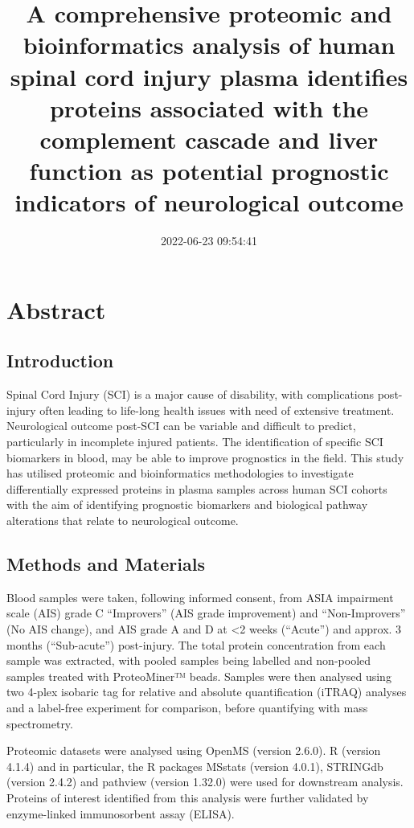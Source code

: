 \documentclass[9pt,lineno]{elife}
\title{A comprehensive proteomic and bioinformatics analysis of human spinal cord injury plasma identifies proteins associated with the complement cascade and liver function as potential prognostic indicators of neurological outcome}
\author{}
\date{2022-06-23 09:54:41}
\begin{document}
\maketitle

\hypertarget{abstract}{%
\section{Abstract}\label{abstract}}

\hypertarget{introduction}{%
\subsection{Introduction}\label{introduction}}

Spinal Cord Injury (SCI) is a major cause of disability, with complications post-injury often leading to life-long health issues with need of extensive treatment.
Neurological outcome post-SCI can be variable and difficult to predict, particularly in incomplete injured patients.
The identification of specific SCI biomarkers in blood, may be able to improve prognostics in the field.
This study has utilised proteomic and bioinformatics methodologies to investigate differentially expressed proteins in plasma samples across human SCI cohorts with the aim of identifying prognostic biomarkers and biological pathway alterations that relate to neurological outcome.

\hypertarget{methods-and-materials}{%
\subsection{Methods and Materials}\label{methods-and-materials}}

Blood samples were taken, following informed consent, from ASIA impairment scale (AIS) grade C ``Improvers'' (AIS grade improvement) and ``Non-Improvers'' (No AIS change), and AIS grade A and D at \textless2 weeks (``Acute'') and approx. 3 months (``Sub-acute'') post-injury.
The total protein concentration from each sample was extracted, with pooled samples being labelled and non-pooled samples treated with ProteoMiner™ beads.
Samples were then analysed using two 4-plex isobaric tag for relative and absolute quantification (iTRAQ) analyses and a label-free experiment for comparison, before quantifying with mass spectrometry.

Proteomic datasets were analysed using OpenMS (version 2.6.0).
R (version 4.1.4) and in particular, the R packages MSstats (version 4.0.1), STRINGdb (version 2.4.2) and pathview (version 1.32.0) were used for downstream analysis.
Proteins of interest identified from this analysis were further validated by enzyme-linked immunosorbent assay (ELISA).
\end{document}
